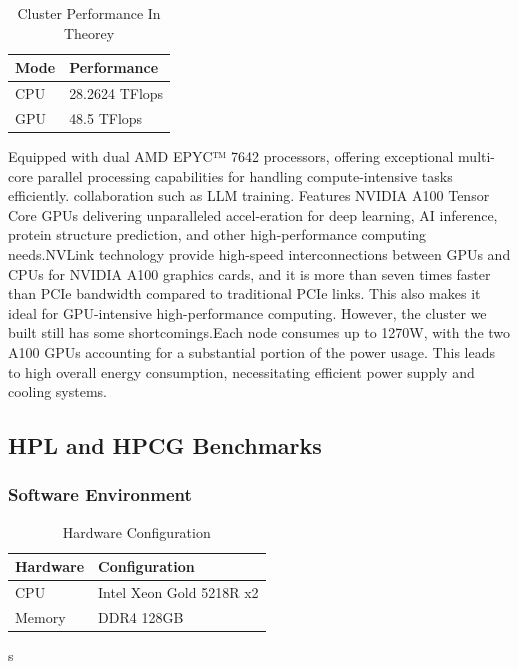 \documentclass[a4paper,12pt]{article}
\begin{document}
\begin{table}[H]
\centering
\vspace{0.5cm}
\begin{tabular}{ll}
\toprule
Mode & Performance \\
\midrule
CPU & 28.2624 TFlops \\
GPU & 48.5 TFlops \\
\bottomrule
\end{tabular}
\caption{Cluster Performance In Theorey}
\end{table}

Equipped with dual AMD EPYC™ 7642 processors, offering exceptional multi-core parallel processing capabilities for handling compute-intensive tasks efficiently. collaboration such as LLM training. Features NVIDIA A100 Tensor Core GPUs delivering unparalleled accel-eration for deep learning, AI inference, protein structure prediction, and other high-performance computing needs.NVLink technology provide high-speed interconnections between GPUs and CPUs for NVIDIA A100 graphics cards, and it is more than seven times faster than PCIe bandwidth compared to traditional PCIe links. This also makes it ideal for GPU-intensive high-performance computing. However, the cluster we built still has some shortcomings.Each node consumes up to 1270W, with the two A100 GPUs accounting for a substantial portion of the power usage. This leads to high overall energy consumption, necessitating efficient power supply and cooling systems.

\subsection{HPL and HPCG Benchmarks}

\subsubsection{Software Environment}

\begin{table}[H]
\centering
\vspace{0.5cm}
\begin{tabular}{ll}
\toprule
Hardware & Configuration \\
\midrule
CPU & Intel Xeon Gold 5218R x2 \\
Memory & DDR4 128GB \\
\bottomrule
\end{tabular}
\caption{Hardware Configuration}s
\end{table}
\end{document}
